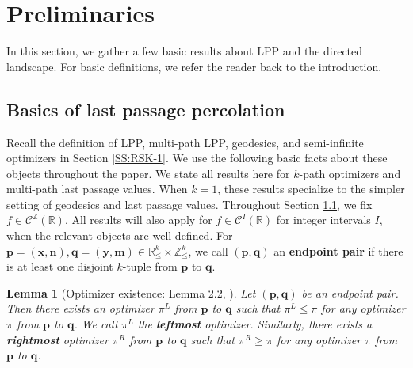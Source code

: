 \documentclass[11pt]{article}
\newcommand{\Z}{\mathbb{Z}}
\newcommand{\R}{\mathbb{R}}
\newcommand{\cC}{\mathcal{C}}
\newcommand{\bx}{\mathbf{x}}
\newcommand{\bn}{\mathbf{n}}
\newcommand{\bm}{\mathbf{m}}
\newcommand{\by}{\mathbf{y}}
\newcommand{\bp}{\mathbf{p}}
\newcommand{\bq}{\mathbf{q}}
\newtheorem{lemma}[theorem]{Lemma}
\theoremstyle{definition} %
\theoremstyle{remark} %
\begin{document}

\section{Preliminaries}
\label{S:prelim}
In this section, we gather a few basic results about LPP and the directed landscape. For basic definitions, we refer the reader back to the introduction.


\subsection{Basics of last passage percolation}
\label{SS:basics-lpp}
Recall the definition of LPP, multi-path LPP, geodesics, and semi-infinite optimizers in Section \ref{SS:RSK-1}. We use the following basic facts about these objects throughout the paper. We state all results here for $k$-path optimizers and multi-path last passage values. When $k = 1$, these results specialize to the simpler setting of geodesics and last passage values. Throughout Section \ref{SS:basics-lpp}, we fix $f \in \cC^\Z(\R)$. All results will also apply for $f \in \cC^I(\R)$ for integer intervals $I$, when the relevant objects are well-defined. For $\bp = (\bx, \bn), \bq = (\by, \bm) \in \R^k_\le \times \Z^k_\le$, we call $(\bp, \bq)$ an \textbf{endpoint pair} if there is at least one disjoint $k$-tuple from $\bp$ to $\bq$.

\begin{lemma}[Optimizer existence: Lemma 2.2, \cite{dauvergne2021disjoint}]
\label{L:optimizer-existence-monotoncity}
Let $(\bp, \bq)$ be an endpoint pair. Then there exists an optimizer $\pi^L$ from $\bp$ to $\bq$ such that $\pi^L \le \pi$ for any optimizer $\pi$ from $\bp$ to $\bq$. We call $\pi^L$ the \textbf{leftmost} optimizer. Similarly, there exists a \textbf{rightmost} optimizer $\pi^R$ from $\bp$ to $\bq$ such that $\pi^R \ge \pi$ for any optimizer $\pi$ from $\bp$ to $\bq$.
\end{lemma}
\end{document}
